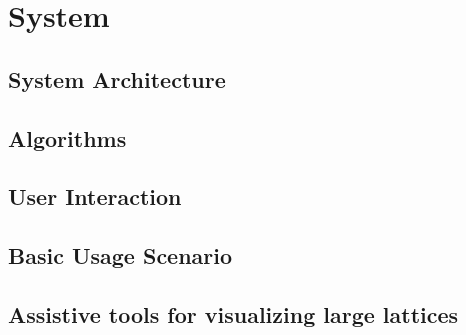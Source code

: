 \section{System}
\subsection{System Architecture}
\subsection{Algorithms}
\subsection{User Interaction}
\subsection{Basic Usage Scenario}
\subsection{Assistive tools for visualizing large lattices}